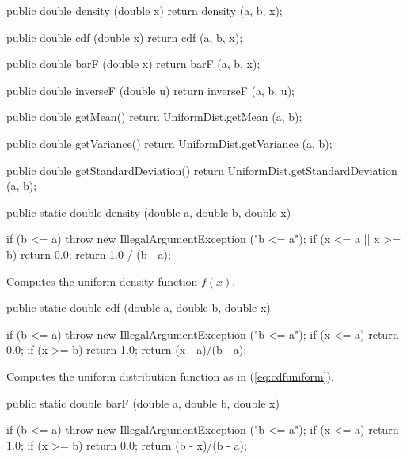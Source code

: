 \begin{code}\begin{hide}

   public double density (double x) {
      return density (a, b, x);
   }

   public double cdf (double x) {
      return cdf (a, b, x);
   }

   public double barF (double x) {
      return barF (a, b, x);
   }

   public double inverseF (double u) {
      return inverseF (a, b, u);
   }

   public double getMean() {
      return UniformDist.getMean (a, b);
   }

   public double getVariance() {
      return UniformDist.getVariance (a, b);
   }

   public double getStandardDeviation() {
      return UniformDist.getStandardDeviation (a, b);
   }\end{hide}

   public static double density (double a, double b, double x)\begin{hide} {
      if (b <= a)
         throw new IllegalArgumentException ("b <= a");
      if (x <= a || x >= b)
         return 0.0;
      return 1.0 / (b - a);
   }\end{hide}
\end{code}
\begin{tabb} Computes the uniform density function
 $f(x)$.
\end{tabb}
\begin{code}

   public static double cdf (double a, double b, double x)\begin{hide} {
      if (b <= a)
        throw new IllegalArgumentException ("b <= a");
      if (x <= a)
         return 0.0;
      if (x >= b)
         return 1.0;
      return (x - a)/(b - a);
   }\end{hide}
\end{code}
 \begin{tabb}
  Computes the uniform distribution function as in (\ref{eq:cdfuniform}).
 \end{tabb}
\begin{code}

   public static double barF (double a, double b, double x)\begin{hide} {
      if (b <= a)
        throw new IllegalArgumentException ("b <= a");
      if (x <= a)
         return 1.0;
      if (x >= b)
         return 0.0;
      return (b - x)/(b - a);
   }\end{hide}
\end{code}
